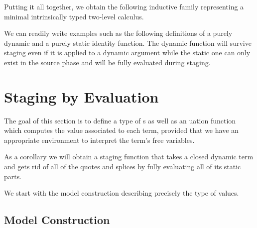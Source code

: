 \documentclass{article}
\begin{document}


Putting it all together, we obtain the following inductive
family representing a minimal intrinsically typed two-level
calculus.

\begin{AgdaAlign}
  \begin{AgdaSuppressSpace}
  \end{AgdaSuppressSpace}
\end{AgdaAlign}

We can readily write examples such as the following definitions
of a purely dynamic and a purely static identity function. The
dynamic function will survive staging even if it is applied to a
dynamic argument while the static one can only exist in the
source phase and will be fully evaluated during staging.

\noindent
\begin{minipage}{.4\textwidth}
\end{minipage}\hfill
\begin{minipage}{.5\textwidth}
\end{minipage}


\section{Staging by Evaluation}

The goal of this section is to define a type of s
as well as an uation function which computes the
value associated to each term, provided that we have an
appropriate environment to interpret the term's free variables.


As a corollary we will obtain a staging function
that takes a closed dynamic term and gets rid of all of
the quotes and splices by fully
evaluating all of its static parts.


We start with the model construction describing precisely
the type of values.

\subsection{Model Construction}\label{sec:stagingmodel}
\end{document}

